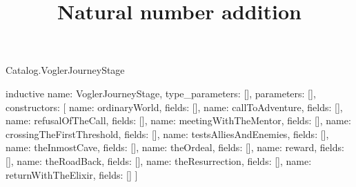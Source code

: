 \begin{lexlean}{Catalog.VoglerJourneyStage}
\title{Natural number addition}
\begin{semanticmodule}
inductive{
  name: VoglerJourneyStage,
  type_parameters: [],
  parameters: [],
  constructors: [
    {name: ordinaryWorld, fields: []},
    {name: callToAdventure, fields: []},
    {name: refusalOfTheCall, fields: []},
    {name: meetingWithTheMentor, fields: []},
    {name: crossingTheFirstThreshold, fields: []},
    {name: testsAlliesAndEnemies, fields: []},
    {name: theInmostCave, fields: []},
    {name: theOrdeal, fields: []},
    {name: reward, fields: []},
    {name: theRoadBack, fields: []},
    {name: theResurrection, fields: []},
    {name: returnWithTheElixir, fields: []}
  ]
}
\end{semanticmodule}
\end{lexlean}
